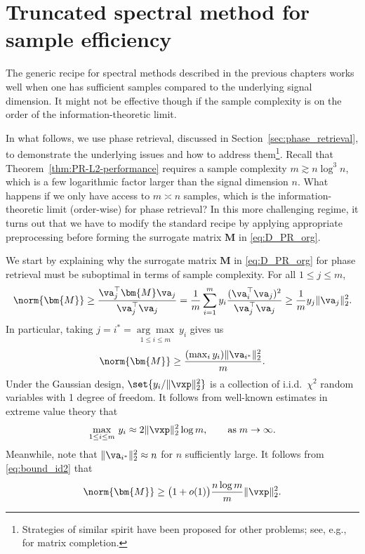 
\section{Truncated spectral method for sample efficiency} \label{sec:improved-spectral-truncated}

The generic recipe for spectral methods described in the previous chapters works well when one has  sufficient samples compared to the underlying signal dimension. It might not be effective though if the sample complexity is on the order of  the information-theoretic limit. 

In what follows, we use phase retrieval, discussed in Section~\ref{sec:phase_retrieval}, to demonstrate the underlying issues and how to address them\footnote{Strategies of similar spirit have been proposed for other problems; see, e.g.,~\citep{keshavan2010matrix} for matrix completion. }. Recall that Theorem~\ref{thm:PR-L2-performance} requires a sample complexity $m \gtrsim n  \log^3 n$, which is a few logarithmic factor larger than the  signal dimension $n$.  
%
What happens if we only have access to $m \asymp n$ samples, which is the information-theoretic limit (order-wise) for phase retrieval? In this more challenging regime, it turns out that we have to modify the standard recipe by applying appropriate preprocessing before forming the surrogate matrix $\bm{M}$ in \eqref{eq:D_PR_org}.


We start by explaining why the surrogate matrix $\bm{M}$ in \eqref{eq:D_PR_org} for phase retrieval must be suboptimal in terms of sample complexity. For all $1 \le j \le m$,
\begin{equation*}
	\norm{\bm{M}} \ge \frac{\va_j^\top \bm{M} \va_j}{\va_j^\top \va_j}=  \frac{1}{m} \sum_{i=1}^m y_i \frac{(\va_i^\top \va_j)^2}{\va_j^\top \va_j} \geq \frac{1}{m}  y_j  \| \va_j \|_2^2.
\end{equation*}
%
In particular, taking $j = i^\ast  = \underset{{1 \le i \le m}}{\arg \max} \ y_i$ gives us
\begin{equation}\label{eq:bound_id2}
	\norm{\bm{M}} \ge \frac{(\max_i y_i) \| \va_{i^\ast} \|_2^2}{m}.
\end{equation}
Under the Gaussian design, $\set{y_i / \| \vxp \|_2^2}$ is a collection of i.i.d.~$\chi^2$ random variables with 1 degree of freedom. It follows from well-known estimates in extreme value theory \citep{Ferguson:1996} that 
\[
\max_{1\le i \le m} \, y_i \approx 2\|\vxp\|_2^2 \log m,\qquad \text{as}\; m \to \infty.
\] 
Meanwhile, note that $\| \va_{i^\ast} \|_2^2  \approx n$ for $n$ sufficiently large. It follows from \eqref{eq:bound_id2} that
\begin{equation}\label{eq:PR_sc}
	\norm{\bm{M}} \ge \big(1+o(1)\big)  \frac{ n \log m}{  m} \|\vxp\|_2^2  .
\end{equation}
%

